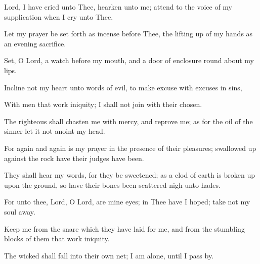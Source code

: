 Lord, I have cried unto Thee, hearken unto me; attend to the voice of my supplication when I cry unto Thee.

Let my prayer be set forth as incense before Thee, the lifting up of my hands as an evening sacrifice.

Set, O Lord, a watch before my mouth, and a door of enclosure round about my lips.

Incline not my heart unto words of evil, to make excuse with excuses in sins,

With men that work iniquity; I shall not join with their chosen.

The righteous shall chasten me with mercy, and reprove me; as for the oil of the sinner let it not anoint my head.

For again and again is my prayer in the presence of their pleasures; swallowed up against the rock have their judges have been.

They shall hear my words, for they be sweetened; as a clod of earth is broken up upon the ground, so have their bones been scattered nigh unto hades.

For unto thee, Lord, O Lord, are mine eyes; in Thee have I hoped; take not my soul away.

Keep me from the snare which they have laid for me, and from the stumbling blocks of them that work iniquity.

The wicked shall fall into their own net; I am alone, until I pass by.
